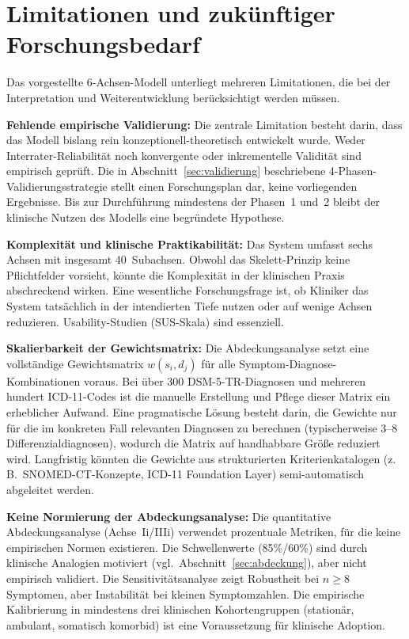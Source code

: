 \documentclass[11pt,a4paper]{article}
\begin{document}
\section{Limitationen und zuk\"unftiger Forschungsbedarf}
\label{sec:limitationen}

Das vorgestellte 6-Achsen-Modell unterliegt mehreren Limitationen, die bei der Interpretation und Weiterentwicklung ber\"ucksichtigt werden m\"ussen.

\textbf{Fehlende empirische Validierung:} Die zentrale Limitation besteht darin, dass das Modell bislang rein konzeptionell-theoretisch entwickelt wurde. Weder Interrater-Reliabilit\"at noch konvergente oder inkrementelle Validit\"at sind empirisch gepr\"uft. Die in Abschnitt~\ref{sec:validierung} beschriebene 4-Phasen-Validierungsstrategie stellt einen Forschungsplan dar, keine vorliegenden Ergebnisse. Bis zur Durchf\"uhrung mindestens der Phasen~1 und~2 bleibt der klinische Nutzen des Modells eine begr\"undete Hypothese.

\textbf{Komplexit\"at und klinische Praktikabilit\"at:} Das System umfasst sechs Achsen mit insgesamt 40~Subachsen. Obwohl das Skelett-Prinzip keine Pflichtfelder vorsieht, k\"onnte die Komplexit\"at in der klinischen Praxis abschreckend wirken. Eine wesentliche Forschungsfrage ist, ob Kliniker das System tats\"achlich in der intendierten Tiefe nutzen oder auf wenige Achsen reduzieren. Usability-Studien (SUS-Skala) sind essenziell.

\textbf{Skalierbarkeit der Gewichtsmatrix:} Die Abdeckungsanalyse setzt eine vollst\"andige Gewichtsmatrix $w(s_i, d_j)$ f\"ur alle Symptom-Diagnose-Kombinationen voraus. Bei \"uber 300 DSM-5-TR-Diagnosen und mehreren hundert ICD-11-Codes ist die manuelle Erstellung und Pflege dieser Matrix ein erheblicher Aufwand. Eine pragmatische L\"osung besteht darin, die Gewichte nur f\"ur die im konkreten Fall relevanten Diagnosen zu berechnen (typischerweise 3--8 Differenzialdiagnosen), wodurch die Matrix auf handhabbare Gr\"o\ss{}e reduziert wird. Langfristig k\"onnten die Gewichte aus strukturierten Kriterienkatalogen (z.\,B.\ SNOMED-CT-Konzepte, ICD-11 Foundation Layer) semi-automatisch abgeleitet werden.

\textbf{Keine Normierung der Abdeckungsanalyse:} Die quantitative Abdeckungsanalyse (Achse~Ii/IIIi) verwendet prozentuale Metriken, f\"ur die keine empirischen Normen existieren. Die Schwellenwerte (85\%/60\%) sind durch klinische Analogien motiviert (vgl.\ Abschnitt~\ref{sec:abdeckung}), aber nicht empirisch validiert. Die Sensitivit\"atsanalyse zeigt Robustheit bei $n \geq 8$ Symptomen, aber Instabilit\"at bei kleinen Symptomzahlen. Die empirische Kalibrierung in mindestens drei klinischen Kohortengruppen (station\"ar, ambulant, somatisch komorbid) ist eine Voraussetzung f\"ur klinische Adoption.
\end{document}
